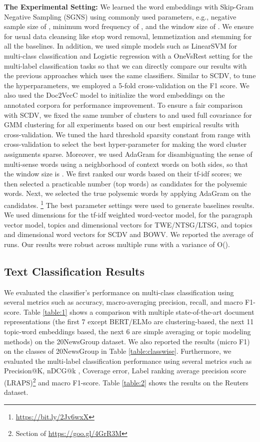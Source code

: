 \documentclass{ecai}
\begin{document}
\vspace{0.5em}
\noindent \textbf{The Experimental Setting: }We learned the word embeddings with Skip-Gram Negative Sampling (SGNS) using commonly used parameters, e.g., negative sample size of , minimum word frequency of , and the window size of . We ensure for usual data cleansing like stop word removal, lemmetization and stemming for all the baselines. In addition, we used simple models such as LinearSVM for multi-class classification and Logistic regression with a OneVsRest setting for the multi-label classification tasks so that we can directly compare our results with the previous approaches which uses the same classifiers. Similar to SCDV, to tune the hyperparameters, we employed a 5-fold cross-validation on the F1 score. We also used the Doc2VecC model \cite{chen2017efficient} to initialize the word embeddings on the annotated corpora for performance improvement. To ensure a fair comparison with SCDV, we fixed the same number of clusters to  and used full covariance for GMM clustering for all experiments based on our best empirical results with cross-validation. We tuned the hard threshold sparsity constant  from range  with cross-validation to select the best hyper-parameter for making the word cluster assignments sparse. Moreover, we used AdaGram \cite{bartunov2016breaking} for disambiguating the sense of multi-sense words using a neighborhood of  context words on both sides, so that the window size is . We first ranked our words based on their tf-idf scores; we then selected a practicable number (top  words) as candidates for the polysemic words. Next, we selected the true polysemic words by applying AdaGram on the candidates. \footnote{\url{https://bit.ly/2Jv6wxX}} The best parameter settings were used to generate baselines results. We used  dimensions for the tf-idf weighted word-vector model,  for the paragraph vector model,  topics and  dimensional vectors for TWE/NTSG/LTSG, and  topics and  dimensional word vectors for SCDV and BOWV. We reported the average of  runs. Our results were robust across multiple runs with a variance of O().

\subsection{Text Classification Results} We evaluated the classifier's performance on multi-class classification using several metrics such as accuracy, macro-averaging precision, recall, and macro F1-score. Table \ref{table:1} shows a comparison with multiple state-of-the-art document representations (the first 7 except BERT/ELMo are clustering-based, the next 11 topic-word embeddings based, the next 6 are simple averaging or topic modeling methods) on the 20NewsGroup dataset. We also reported the results (micro F1) on the  classes of 20NewsGroup in Table \ref{table:classwise}. Furthermore, we evaluated the multi-label classification performance using several metrics such as Precision@K, nDCG@k \cite{bhatia2015sparse}, Coverage error, Label ranking average precision score (LRAPS)\footnote{Section  of \url{https://goo.gl/4GrR3M}} and macro F1-score. Table \ref{table:2} shows the results on the Reuters dataset.
\end{document}
